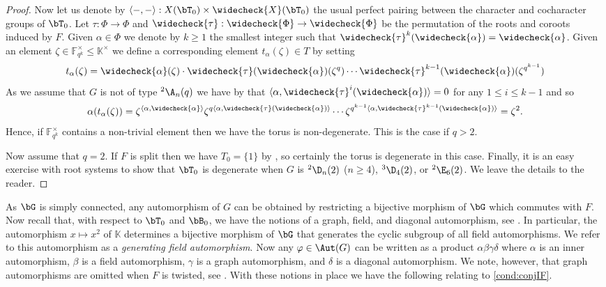\documentclass[eqthmnum, nocolour]{jt-calcs}
\begin{document}
\begin{proof}
Now let us denote by $\langle-,-\rangle : X(\bT_0) \times \widecheck{X}(\bT_0)$ the usual perfect pairing between the character and cocharacter groups of $\bT_0$. Let $\tau : \Phi \to \Phi$ and $\widecheck{\tau} : \widecheck{\Phi} \to \widecheck{\Phi}$ be the permutation of the roots and coroots induced by $F$. Given $\alpha \in \Phi$ we denote by $k\geqslant 1$ the smallest integer such that $\widecheck{\tau}^k(\widecheck{\alpha}) = \widecheck{\alpha}$. Given an element $\zeta \in \mathbb{F}_{q^k}^{\times} \leqslant \mathbb{K}^{\times}$ we define a corresponding element $t_{\alpha}(\zeta) \in T$ by setting
\begin{equation*}
t_{\alpha}(\zeta) = \widecheck{\alpha}(\zeta)\cdot\widecheck{\tau}(\widecheck{\alpha})(\zeta^q) \cdots \widecheck{\tau}^{k-1}(\widecheck{\alpha})(\zeta^{q^{k-1}})
\end{equation*}
As we assume that $G$ is not of type ${}^2\A_n(q)$ we have by \cite[10.3.2(iii)]{springer:2009:linear-algebraic-groups} that $\langle\alpha,\widecheck{\tau}^i(\widecheck{\alpha})\rangle = 0$ for any $1 \leqslant i \leqslant k-1$ and so
\begin{equation*}
\alpha(t_{\alpha}(\zeta)) = \zeta^{\langle \alpha,\widecheck{\alpha}\rangle}\zeta^{q\langle \alpha,\widecheck{\tau}(\widecheck{\alpha})\rangle}\cdots \zeta^{q^{k-1}\langle \alpha,\widecheck{\tau}^{k-1}(\widecheck{\alpha})\rangle} = \zeta^2.
\end{equation*}
Hence, if $\mathbb{F}_{q^k}^{\times}$ contains a non-trivial element then we have the torus is non-degenerate. This is the case if $q>2$.

Now assume that $q=2$. If $F$ is split then we have $T_0 = \{1\}$ by \cite[3.6.7]{carter:1993:finite-groups-of-lie-type}, so certainly the torus is degenerate in this case. Finally, it is an easy exercise with root systems to show that $\bT_0$ is degenerate when $G$ is ${}^2\D_n(2)$ ($n \geqslant 4$), ${}^3\D_4(2)$, or ${}^2\E_6(2)$. We leave the details to the reader.
\end{proof}

\begin{pa}
As $\bG$ is simply connected, any automorphism of $G$ can be obtained by restricting a bijective morphism of $\bG$ which commutes with $F$. Now recall that, with respect to $\bT_0$ and $\bB_0$, we have the notions of a graph, field, and diagonal automorphism, see \cite[Theorem 30, pg.\ 158]{steinberg:1968:lectures-on-chevalley-groups}. In particular, the automorphism $x \mapsto x^2$ of $\mathbb{K}$ determines a bijective morphism of $\bG$ that generates the cyclic subgroup of all field automorphisms. We refer to this automorphism as a \emph{generating field automorphism}. Now any $\varphi \in \Aut(G)$ can be written as a product $\alpha\beta\gamma\delta$ where $\alpha$ is an inner automorphism, $\beta$ is a field automorphism, $\gamma$ is a graph automorphism, and $\delta$ is a diagonal automorphism. We note, however, that graph automorphisms are omitted when $F$ is twisted, see \cite[Theorem 36, pg.\ 195]{steinberg:1968:lectures-on-chevalley-groups}. With these notions in place we have the following relating to \cref{cond:conjIF}.
\end{pa}
\end{document}
